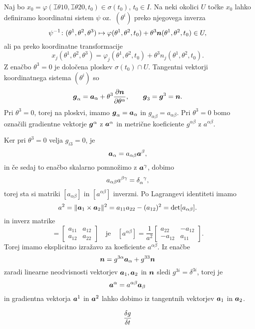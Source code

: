 Naj bo $x_0=\varphi(\topbot{\theta}{1}{0},\topbot{\theta}{2}{0},t_0)\in\sigma(t_0)$, $t_0\in I$.
Na neki okolici $U$ točke $x_0$ lahko definiramo koordinatni sistem $\psi$ oz.~$(\theta^i)$
preko njegovega inverza
\[
	\psi^{-1}\colon(\theta^1,\theta^2,\theta^3)\mapsto\varphi(\theta^1,\theta^2,t_0)+
	\theta^3\boldsymbol n(\theta^1,\theta^2,t_0)\in U,
\]
ali pa preko koordinatne transformacije
\[
	x_j(\theta^1,\theta^2,\theta^3)=\varphi_j(\theta^1,\theta^2,t_0)+\theta^3 n_j(\theta^1,\theta^2,t_0).
\]
Z enačbo $\theta^3=0$ je določena ploskev $\sigma(t_0)\cap U$.
Tangentni vektorji koordinatnega sistema $(\theta^i)$ so
\[
	\boldsymbol g_{\alpha}=\boldsymbol a_{\alpha}+\theta^3\frac{\partial\boldsymbol n}{\partial\theta^{\alpha}},
	\qquad \boldsymbol g_3=\boldsymbol g^3=\boldsymbol n.
\]
Pri $\theta^3=0$, torej na ploskvi, imamo $\boldsymbol g_{\alpha}=\boldsymbol a_{\alpha}$ in
$g_{\alpha\beta}=a_{\alpha\beta}$. Pri $\theta^3=0$
bomo označili gradientne vektorje $\boldsymbol g^{\alpha}$ z $\boldsymbol a^{\alpha}$
in metrične koeficiente $g^{\alpha\beta}$ z $a^{\alpha\beta}$.

Ker pri $\theta^3=0$ velja $g_{i3}=0$, je
\[ \boldsymbol a_{\alpha}=a_{\alpha\beta}\boldsymbol a^{\beta}, \]
in če sedaj to enačbo skalarno pomnožimo z $\boldsymbol a^{\gamma}$, dobimo
\[ a_{\alpha\beta}a^{\beta\gamma}=\bottop{\delta}{\alpha}{\gamma}, \]
torej sta si matriki $[a_{\alpha\beta}]$ in $[a^{\alpha\beta}]$ inverzni.
Po Lagrangevi identiteti imamo
\[ a^2=\|\boldsymbol a_1\times\boldsymbol a_2\|^2=a_{11}a_{22}-(a_{12})^2=\det[a_{\alpha\beta}]. \]
in inverz matrike
\begin{equation*}
	[a_{\alpha\beta}]=\left[\begin{array}{cc}
		a_{11}&a_{12}\\a_{12}&a_{22}
	\end{array}\right] \quad\textrm{je}\quad
	[a^{\alpha\beta}]=\frac{1}{a^2}\left[\begin{array}{rr}
		a_{22}&-a_{12}\\-a_{12}&a_{11}
	\end{array}\right].
\end{equation*}
Torej imamo eksplicitno izražavo za koeficiente $a^{\alpha\beta}$.  Iz enačbe
\[ \boldsymbol n=g^{3\alpha}\boldsymbol a_{\alpha}+g^{33}\boldsymbol n \]
zaradi linearne neodvisnosti vektorjev $\boldsymbol a_1,\boldsymbol a_2$ in $\boldsymbol n$ sledi
$g^{3i}=\delta^{3i}$, torej je
\[ \boldsymbol a^{\alpha}=a^{\alpha\beta}\boldsymbol a_{\beta} \]
in gradientna vektorja $\boldsymbol a^1$ in $\boldsymbol a^2$ lahko dobimo iz tangentnih
vektorjev $\boldsymbol a_1$ in $\boldsymbol a_2$.
	

\[\frac{\delta g}{\delta t}\]
